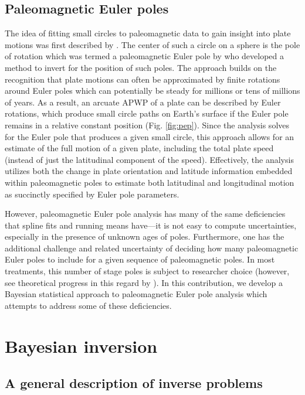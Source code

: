 \documentclass[]{agujournal2019}
\begin{document}
\subsection{Paleomagnetic Euler poles}
The idea of fitting small circles to paleomagnetic data to gain insight into plate motions was first described by . The center of such a circle on a sphere is the pole of rotation which was termed a paleomagnetic Euler pole by  who developed a method to invert for the position of such poles. The approach builds on the recognition that plate motions can often be approximated by finite rotations around Euler poles which can potentially be steady for millions or tens of millions of years. As a result, an arcuate APWP of a plate can be described by Euler rotations, which produce small circle paths on Earth's surface if the Euler pole remains in a relative constant position (Fig. \ref{fig:pep}). Since the analysis solves for the Euler pole that produces a given small circle, this approach allows for an estimate of the full motion of a given plate, including the total plate speed (instead of just the latitudinal component of the speed). Effectively, the analysis utilizes both the change in plate orientation and latitude information embedded within paleomagnetic poles to estimate both latitudinal and longitudinal motion as succinctly specified by Euler pole parameters.

However, paleomagnetic Euler pole analysis has many of the same deficiencies that spline fits and running means have---it is not easy to compute uncertainties, especially in the presence of unknown ages of poles. Furthermore, one has the additional challenge and related uncertainty of deciding how many paleomagnetic Euler poles to include for a given sequence of paleomagnetic poles. In most treatments, this number of stage poles is subject to researcher choice (however, see theoretical progress in this regard by ). In this contribution, we develop a Bayesian statistical approach to paleomagnetic Euler pole analysis which attempts to address some of these deficiencies.

\section{Bayesian inversion}
\subsection{A general description of inverse problems}
\end{document}
